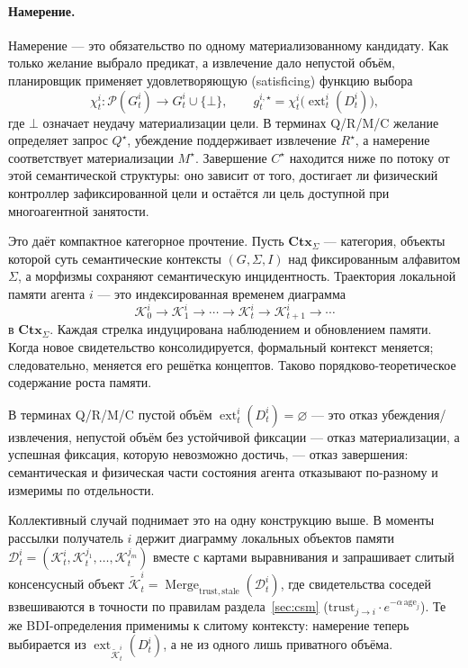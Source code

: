 \documentclass{article}
\begin{document}
\paragraph{Намерение.} Намерение --- это обязательство по одному
материализованному кандидату. Как только желание выбрало предикат, а
извлечение дало непустой объём, планировщик применяет
удовлетворяющую (satisficing) функцию выбора
\[
\chi_t^i:\mathcal{P}(G_t^i)\rightarrow G_t^i\cup\{\bot\},
\qquad
g_t^{i,\star}=\chi_t^i\!\big(\operatorname{ext}_t^i(D_t^i)\big),
\]
где $\bot$ означает неудачу материализации цели. В терминах Q/R/M/C
желание определяет запрос $Q^\star$, убеждение поддерживает извлечение
$R^\star$, а намерение соответствует материализации $M^\star$.
Завершение $C^\star$ находится ниже по потоку от этой семантической
структуры: оно зависит от того, достигает ли физический контроллер
зафиксированной цели и остаётся ли цель доступной при многоагентной
занятости.

Это даёт компактное категорное прочтение. Пусть $\mathbf{Ctx}_\Sigma$
--- категория, объекты которой суть семантические контексты
$(G,\Sigma,I)$ над фиксированным алфавитом $\Sigma$, а морфизмы
сохраняют семантическую инцидентность. Траектория локальной памяти
агента $i$ --- это индексированная временем диаграмма
\[
\mathcal{K}_0^i\rightarrow\mathcal{K}_1^i\rightarrow\cdots
\rightarrow\mathcal{K}_t^i\rightarrow\mathcal{K}_{t+1}^i\rightarrow\cdots
\]
в $\mathbf{Ctx}_\Sigma$. Каждая стрелка индуцирована наблюдением и
обновлением памяти. Когда новое свидетельство консолидируется,
формальный контекст меняется; следовательно, меняется его решётка
концептов. Таково порядково-теоретическое содержание роста памяти.

В терминах Q/R/M/C пустой объём
$\operatorname{ext}_t^i(D_t^i)=\varnothing$ --- это отказ
убеждения/извлечения, непустой объём без устойчивой фиксации --- отказ
материализации, а успешная фиксация, которую невозможно достичь, ---
отказ завершения: семантическая и физическая части состояния агента
отказывают по-разному и измеримы по отдельности.

Коллективный случай поднимает это на одну конструкцию выше. В моменты
рассылки получатель $i$ держит диаграмму локальных объектов памяти
$\mathcal{D}_t^i=(\mathcal{K}_t^i,\mathcal{K}_t^{j_1},\ldots,
\mathcal{K}_t^{j_m})$ вместе с картами выравнивания и запрашивает
слитый консенсусный объект
$\widetilde{\mathcal{K}}_t^i=\operatorname{Merge}_{\mathrm{trust},
\mathrm{stale}}(\mathcal{D}_t^i)$, где свидетельства соседей
взвешиваются в точности по правилам раздела~\ref{sec:csm}
($\mathrm{trust}_{j\to i}\cdot e^{-\alpha\,\mathrm{age}_j}$). Те же
BDI-определения применимы к слитому контексту: намерение теперь
выбирается из $\operatorname{ext}_{\widetilde{\mathcal{K}}_t^i}(D_t^i)$,
а не из одного лишь приватного объёма.
\end{document}
